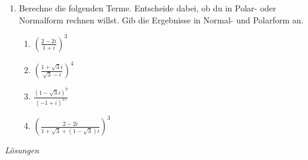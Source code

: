 \begin{ueb}
\begin{enumerate}
        \item Berechne die folgenden Terme. Entscheide dabei, ob du in Polar- oder Normalform rechnen willst. Gib die Ergebnisse in Normal- und Polarform an.
        \begin{enumerate}
            \item $\left( \frac{2 - 2i}{1 + i} \right)^3$
            \item $\left( \frac{1 + \sqrt{3} i}{\sqrt{3} - i} \right)^4$
            \item $\frac{(1 - \sqrt{3} i)^9}{(-1 + i)^{15}}$
            \item $\left( \frac{2 - 2i}{1 + \sqrt{3} + (1 - \sqrt{3}) i} \right)^3$
        \end{enumerate}
    \end{enumerate}
\end{ueb}

\clearpage
\emph{Lösungen}

